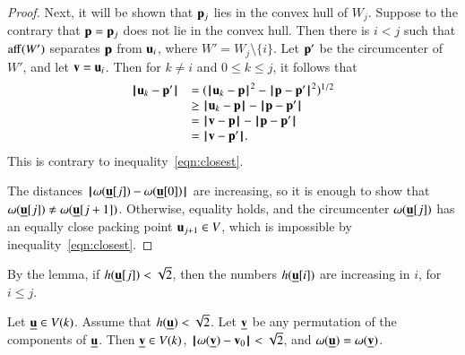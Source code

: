\begin{proof}
%
  Next, it will be shown that ${\mathbf p}_j$ lies in the convex hull of $W_j$.
Suppose to the contrary that ${\mathbf p}={\mathbf p}_j$ does not lie in the convex hull. Then there is $i<j$ such that ${\operatorname{aff}}(W')$ separates ${\mathbf p}$ from $ {\mathbf u}_i$, where  $W'=W_j\setminus\{i\}$.  Let ${\mathbf p}'$ be the circumcenter of $W'$, and let ${\mathbf v}= {\mathbf u}_i$.  Then for $k\ne i$ and $0\le k\le j$, it follows that
\begin{displaymath}
\begin{array}{lll}
\norm{ \u_k}{\p'} &= (\norm{ \u_k}{\p}^2 - \norm{\p}{\p'}^2)^{1/2} \\
  &\ge \norm{ \u_k}{\p} - \norm{\p}{\p'} \\
  &=\norm{\v}{\p} - \norm{\p}{\p'}\\
  &=\norm{\v}{\p'}.
\end{array}
\end{displaymath}
This is contrary to inequality~\ref{eqn:closest}.


  The distances ${\hskip0.1em|\hskip-0.15em|\hskip0.1em}\omega({\underline{{\mathbf u}}}[j]) - \omega({\underline{{\mathbf u}}}[0]){\hskip0.1em|\hskip-0.15em|\hskip0.1em}$ are increasing, so it is enough to show
that $\omega({\underline{{\mathbf u}}}[j])\ne \omega({\underline{{\mathbf u}}}[j+1])$.  Otherwise,   equality holds, and the circumcenter $\omega({\underline{{\mathbf u}}}[j])$
has an equally close packing point $ {\mathbf u}_{j+1}\in V$, which is impossible by inequality~\ref{eqn:closest}.
\end{proof}





By the lemma, if $h({\underline{{\mathbf u}}}[j])<\sqrt2$, then the numbers $h({\underline{{\mathbf u}}}[i])$ are increasing in $i$, for $i\le j$.


\begin{lemma}   
Let ${\underline{{\mathbf u}}}\in V(k)$.  Assume that $h({\underline{{\mathbf u}}})<\sqrt2$. Let ${\underline{{\mathbf v}}}$ be any permutation of the components of ${\underline{{\mathbf u}}}$.  
Then ${\underline{{\mathbf v}}}\in V(k)$, ${\hskip0.1em|\hskip-0.15em|\hskip0.1em}\omega({\underline{{\mathbf v}}}) - {\mathbf v}_0{\hskip0.1em|\hskip-0.15em|\hskip0.1em}<\sqrt2$, and  $\omega({\underline{{\mathbf u}}}) = \omega({\underline{{\mathbf v}}})$.
\end{lemma}

